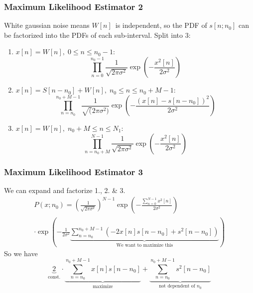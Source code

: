 \documentclass[compress]{beamer}
\begin{document}
\begin{frame} %
    \frametitle{Maximum Likelihood Estimator 2}
    White gaussian noise means $W[n]$ is independent, so the PDF of $s[n;n_0]$
    can be factorized into the PDFs of each sub-interval.
    Split into 3:
    \begin{enumerate}
        \item $x[n]=W[n],\; 0 \le n \le n_0-1$:
            \begin{equation*}
                \prod^{n_0-1}_{n=0}{\frac{1}{\sqrt{2\pi\sigma^2}}
                \exp\left(-\frac{x^2[n]}{2 \sigma^2}\right)}
            \end{equation*}
        \item $x[n]=S\left[n-n_0\right]+W[n], \; n_0 \le n \le n_0+M-1$:
            \begin{equation*}
                \prod^{n_0+M-1}_{n=n_0}{\frac{1}{\sqrt(2\pi\sigma^2)}
                \exp\left(-\frac{\left(x[n]-s[n-n_0]\right)^2}{2\sigma^2}\right)}
            \end{equation*}
        \item $x[n] = W[n], \; n_0+M \le n \le N_1$:
            \begin{equation*}
                \prod^{N-1}_{n=n_0+M}{\frac{1}{\sqrt{2\pi\sigma^2}}
                \exp\left(-\frac{x^2[n]}{2\sigma^2}\right)}
            \end{equation*}
    \end{enumerate}
\end{frame} %

\begin{frame} %
    \frametitle{Maximum Likelihood Estimator 3}
    We can expand and factorize 1., 2. \& 3. 
    \begin{gather*}
        P(x; n_0)  = \left(\frac{1}{\sqrt{2\pi\sigma^2}}\right)^{N-1}
        \exp\left(-\frac{\sum^{N-1}_{n=0}{x^2[n]}}{2\sigma^2}\right) \\
        \cdot\exp\left(
            -\frac{1}{2\sigma^2}
            \underbrace{
                \sum^{n_0+M-1}_{n=n_0}{\left(
                        -2x[n]s[n-n_0]+s^2[n-n_0]
                \right)}
            }_{\text{We want to maximize this}}
        \right)
    \end{gather*}
    So we have 
    \begin{equation*}
        \underbrace{2}_{\text{const.}}
        \cdot
        \underbrace{
            \sum^{n_0+M-1}_{n=n_0}{x[n]s[n-n_0]}
        }_{\text{maximize}}
        +
        \underbrace{
            \sum^{n_0+M-1}_{n=n_0}{s^2[n-n_0]}
        }_{\text{not dependent of } n_0}
    \end{equation*}
\end{frame} %
\end{document}
